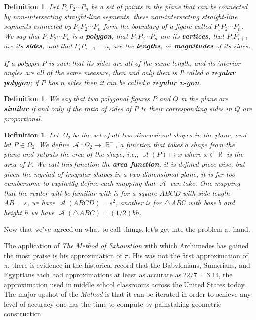 \documentclass[letterpaper, 12pt]{amsart}
\DeclareMathOperator{\R}{\mathbb{R}}
\DeclareMathOperator{\A}{\mathcal{A}}
\newtheorem{defn}[thm]{Definition}
\theoremstyle{definition}  %
\begin{document}
		\begin{defn}
		\label{defn:polygon}
		Let $P_{1}P_{2} \cdots P_{n}$ be a set of points in the plane that can be connected by non-intersecting straight-line segments, these non-intersecting straight-line segments connected by $P_{1}P_{2} \cdots P_{n}$ form the boundary of a figure called $P_{1}P_{2} \cdots P_{n}$.
		We say that $P_{1}P_{2} \cdots P_{n}$ is a \textbf{polygon}, that $P_{1}P_{2} \cdots P_{n}$ are its \textbf{vertices}, that $\overline{P_{i}P_{i+1}}$ are its \textbf{sides}, and that $P_{i}P_{i+1} = a_{i}$ are the \textbf{lengths}, or \textbf{magnitudes} of its sides.

		If a polygon $P$ is such that its sides are all of the same length, and its interior angles are all of the same measure, then and only then is $P$ called a \textbf{regular polygon}; if $P$ has $n$ sides then it can be called a \textbf{regular n-gon}.
		\end{defn}

		\begin{defn}
		\label{defn:sim_polygons}
		We say that two polygonal figures $P$ and $Q$ in the plane are \textbf{similar} if and only if the ratio of sides of $P$ to their corresponding sides in $Q$ are proportional.
		\end{defn}

		\begin{defn}
		\label{defn:area_function}
		Let $\, \Omega_{2}$ be the set of all two-dimensional shapes in the plane, and let $P \in \Omega_{2}$.
		We define $\A : \Omega_{2} \to \R^{+}$, a function that takes a shape from the plane and outputs the area of the shape, i.e., $\A(P) \mapsto x$ where $x \in \R$ is the area of $P$.
		We call this function the \textbf{area function}, it is defined piece-wise, but given the myriad of irregular shapes in a two-dimensional plane, it is far too cumbersome to explicitly define each mapping that $\A$ can take.
		One mapping that the reader will be familiar with is for a square $ABCD$ with side length $AB = s$, we have $\A(ABCD) = s^{2}$, another is for $\triangle ABC$ with base $b$ and height $h$ we have $\A(\triangle ABC) = (1/2)bh$.
		\end{defn}
		Now that we've agreed on what to call things, let's get into the problem at hand.

		The application of \textit{The Method of Exhaustion} with which Archimedes has gained the most praise is his approximation of $\pi$.
		His was not the first approximation of $\pi$, there is evidence in the historical record that the Babylonians, Sumerians, and Egyptians each had approximations at least as accurate as $22/7 \doteq 3.14$, the approximation used in middle school classrooms across the United States today.
		The major upshot of the \textit{Method} is that it can be iterated in order to achieve any level of accuracy one has the time to compute by painstaking geometric construction.
\end{document}
